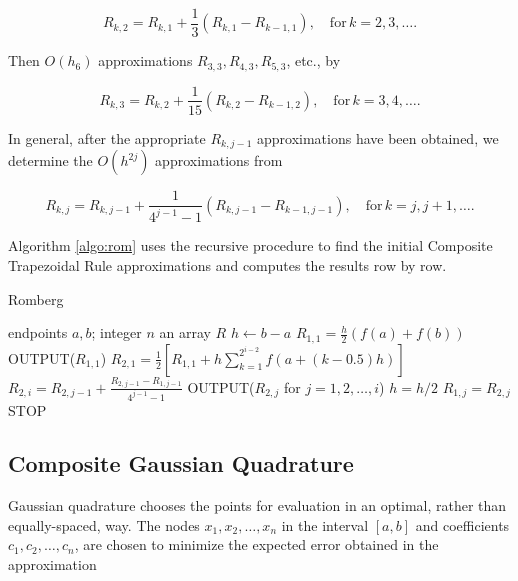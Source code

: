 \documentclass[preprint,12pt]{elsarticle}
\begin{document}
\begin{equation}
    R_{k,2}=R_{k,1}+\frac{1}{3}(R_{k,1}-R_{k-1,1}),\quad \mathrm{for}\,k=2,3,\dots.
\end{equation}

Then $O(h_6)$ approximations $R_{3,3},R_{4,3},R_{5,3}$, etc., by

\begin{equation}
    R_{k,3}=R_{k,2}+\frac{1}{15}(R_{k,2}-R_{k-1,2}),\quad \mathrm{for}\,k=3,4,\dots.
\end{equation}

In general, after the appropriate $R_{k,j-1}$ approximations have been obtained, we determine the $O(h^{2j})$ approximations from

\begin{equation}
    R_{k,j}=R_{k,j-1}+\frac{1}{4^{j-1}-1}(R_{k,j-1}-R_{k-1,j-1}),\quad \mathrm{for}\,k=j,j+1,\dots.
\end{equation}

Algorithm \ref{algo:rom} uses the recursive procedure to find the initial Composite Trapezoidal Rule approximations and computes the results row by row.

\begin{algorithm}
    \caption{Romberg}
    \label{algo:rom}
    \begin{algorithmic}[1]
    \Require endpoints $a,b$; integer $n$
    \Ensure an array $R$
    \State $h\gets b-a$
    \State $R_{1,1}=\frac{h}{2}(f(a)+f(b))$
    \State OUTPUT($R_{1,1}$)
        \State $R_{2,1}=\frac{1}{2}\left[R_{1,1}+h\sum_{k=1}^{2^{i-2}}f(a+(k-0.5)h)\right]$
            \State $R_{2,i}=R_{2,j-1}+\frac{R_{2,j-1}-R_{1,j-1}}{4^{j-1}-1}$
            \State OUTPUT($R_{2,j}$ for $j=1,2,\dots,i$)
            \State $h=h/2$
                \State $R_{1,j}=R_{2,j}$
            \EndFor
        \EndFor
    \EndFor
    \State STOP
    \end{algorithmic}
\end{algorithm}

\subsection{Composite Gaussian Quadrature}
\label{SS:2.3}

Gaussian quadrature chooses the points for evaluation in an optimal, rather than equally-spaced, way. The nodes $x_1, x_2,\dots,x_n$ in the interval $[a,b]$ and coefficients $c_1,c_2,\dots,c_n$, are chosen to minimize the expected error obtained in the approximation
\end{document}
